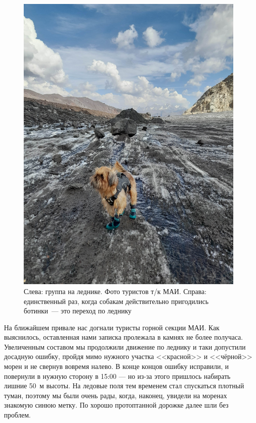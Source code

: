 \begin{figure}[h!]
\begin{minipage}[h]{0.4\linewidth}
		\includegraphics[width=0.99\linewidth]{../pics/20240830_155136.jpg}
	\end{minipage}
	\caption{Слева: группа на леднике. Фото туристов т/к МАИ. Справа: единственный раз, когда собакам действительно пригодились ботинки~--- это переход по леднику}
	\label{fig:20240830_141852}
\end{figure}

На ближайшем привале нас догнали туристы горной секции МАИ. Как выяснилось, оставленная нами записка пролежала в камнях не более получаса. Увеличенным составом мы продолжили движение по леднику и таки допустили досадную ошибку, пройдя мимо нужного участка <<красной>> и <<чёрной>> морен и не свернув вовремя налево. В конце концов ошибку исправили, и повернули в нужную сторону в 15:00 --- но из-за этого пришлось набирать лишние 50~м высоты. На ледовые поля тем временем стал спускаться плотный туман, поэтому мы были очень рады, когда, наконец, увидели на моренах знакомую синюю метку. По хорошо протоптанной дорожке далее шли без проблем. 

